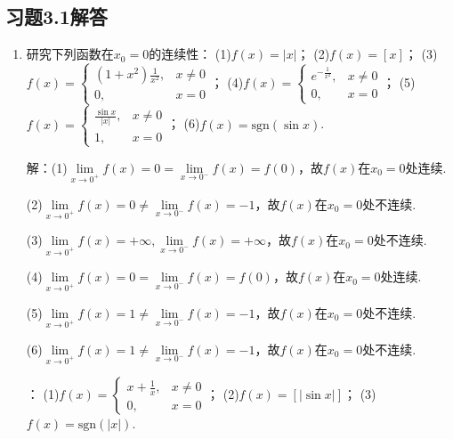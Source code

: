\documentclass[12pt,UTF8]{ctexart}
\begin{document}
\subsection{习题3.1解答}
\begin{enumerate}
\item 研究下列函数在$x_0=0$的连续性：
\newline
(1)$f(x)=|x|$；
\newline
(2)$f(x)=[x]$；
\newline
(3)$f(x)=\begin{cases}
(1+x^2)\frac1{x^2},&x\neq0\\
0,&x=0
\end{cases}$；
\newline
(4)$f(x)=\begin{cases}
e^{-\frac1{x^2}},&x\neq0\\
0,&x=0
\end{cases}$；
\newline
(5)$f(x)=\begin{cases}
\frac{\sin x}{|x|},&x\neq0\\
1,&x=0
\end{cases}$；
\newline
(6)$f(x)=\text{sgn}(\sin x)$.

解：(1)$\lim\limits_{x\rightarrow0^+}f(x)=0=\lim\limits_{x\rightarrow0^-}f(x)=f(0)$，故$f(x)$在$x_0=0$处连续.

(2)$\lim\limits_{x\rightarrow0^+}f(x)=0\neq\lim\limits_{x\rightarrow0^-}f(x)=-1$，故$f(x)$在$x_0=0$处不连续.

(3)$\lim\limits_{x\rightarrow0^+}f(x)=+\infty,\lim\limits_{x\rightarrow0^-}f(x)=+\infty$，故$f(x)$在$x_0=0$处不连续.

(4)$\lim\limits_{x\rightarrow0^+}f(x)=0=\lim\limits_{x\rightarrow0^-}f(x)=f(0)$，故$f(x)$在$x_0=0$处连续.

(5)$\lim\limits_{x\rightarrow0^+}f(x)=1\neq\lim\limits_{x\rightarrow0^-}f(x)=-1$，故$f(x)$在$x_0=0$处不连续.

(6)$\lim\limits_{x\rightarrow0^+}f(x)=1\neq\lim\limits_{x\rightarrow0^-}f(x)=-1$，故$f(x)$在$x_0=0$处不连续.

：
\newline
(1)$f(x)=\begin{cases}
x+\frac1x,&x\neq0\\
0,&x=0
\end{cases}$；
\newline
(2)$f(x)=[|\sin x|]$；
\newline
(3)$f(x)=\text{sgn}(|x|)$.


\end{enumerate}
\end{document}
